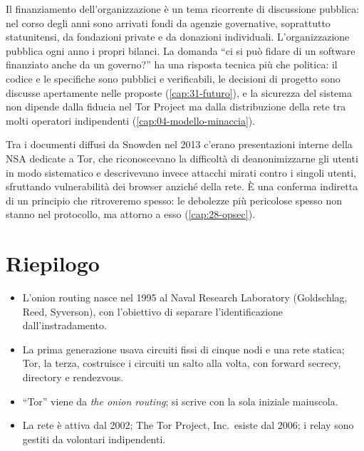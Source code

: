 Il finanziamento dell'organizzazione è un tema ricorrente di discussione pubblica: nel corso degli anni sono arrivati fondi da agenzie governative, soprattutto statunitensi, da fondazioni private e da donazioni individuali. L'organizzazione pubblica ogni anno i propri bilanci. La domanda \enquote{ci si può fidare di un software finanziato anche da un governo?} ha una risposta tecnica più che politica: il codice e le specifiche sono pubblici e verificabili, le decisioni di progetto sono discusse apertamente nelle proposte (\cref{cap:31-futuro}), e la sicurezza del sistema non dipende dalla fiducia nel Tor Project ma dalla distribuzione della rete tra molti operatori indipendenti (\cref{cap:04-modello-minaccia}).

\begin{approfondimento}
Tra i documenti diffusi da Snowden nel 2013 c'erano presentazioni interne della NSA dedicate a Tor, che riconoscevano la difficoltà di deanonimizzarne gli utenti in modo sistematico e descrivevano invece attacchi mirati contro i singoli utenti, sfruttando vulnerabilità dei browser anziché della rete. È una conferma indiretta di un principio che ritroveremo spesso: le debolezze più pericolose spesso non stanno nel protocollo, ma attorno a esso (\cref{cap:28-opsec}).
\end{approfondimento}

\section*{Riepilogo}
\begin{itemize}
  \item L'onion routing nasce nel 1995 al Naval Research Laboratory (Goldschlag, Reed, Syverson), con l'obiettivo di separare l'identificazione dall'instradamento.
  \item La prima generazione usava circuiti fissi di cinque nodi e una rete statica; Tor, la terza, costruisce i circuiti un salto alla volta, con forward secrecy, directory e rendezvous.
  \item \enquote{Tor} viene da \emph{the onion routing}; si scrive con la sola iniziale maiuscola.
  \item La rete è attiva dal 2002; The Tor Project, Inc.\ esiste dal 2006; i relay sono gestiti da volontari indipendenti.
\end{itemize}

